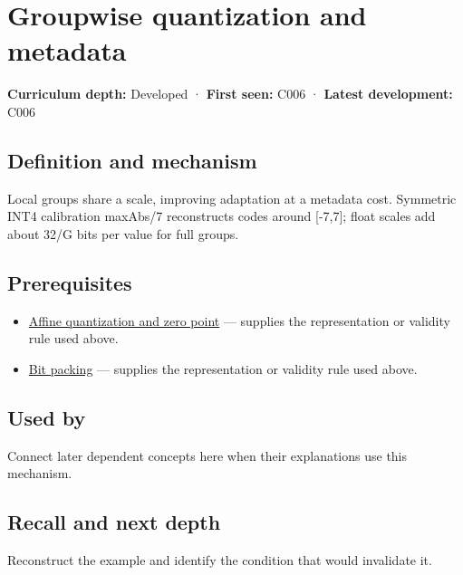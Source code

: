 \hypertarget{appendix-638204c40e8b}{}\label{referencestart:appendix-638204c40e8b}
\section{Groupwise quantization and metadata}\label{appendix-638204c40e8b-groupwise-quantization-and-metadata}

\textbf{Curriculum depth:} Developed · \textbf{First seen:} C006 · \textbf{Latest development:} C006

\subsection{Definition and mechanism}\label{appendix-638204c40e8b-definition-and-mechanism}

Local groups share a scale, improving adaptation at a metadata cost. Symmetric INT4 calibration maxAbs/7 reconstructs codes around {[}-7,7{]}; float scales add about 32/G bits per value for full groups.

\subsection{Prerequisites}\label{appendix-638204c40e8b-prerequisites}

\begin{itemize}
\tightlist
\item
  \hyperref[appendix-d5da3eaabaef]{Affine quantization and zero point} --- supplies the representation or validity rule used above.
\item
  \hyperref[appendix-1f9963e1a5d1]{Bit packing} --- supplies the representation or validity rule used above.
\end{itemize}

\subsection{Used by}\label{appendix-638204c40e8b-used-by}

Connect later dependent concepts here when their explanations use this mechanism.

\subsection{Recall and next depth}\label{appendix-638204c40e8b-recall-and-next-depth}

Reconstruct the example and identify the condition that would invalidate it.

